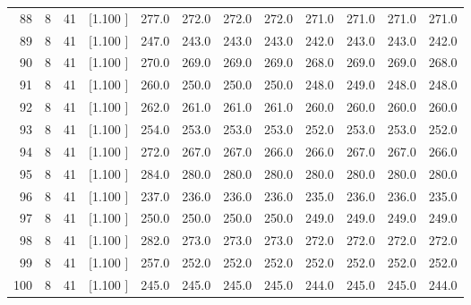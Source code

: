\documentclass[12pt,a4paper]{article}
\begin{document}
\begin{center}
{\begin{tabular}{r r r r r r r r r r r r}
  88&  8& 41&[1.100     ]&   277.0&   272.0&   272.0&   272.0&   271.0&   271.0&   271.0&   271.0\\[-0.02in]
  89&  8& 41&[1.100     ]&   247.0&   243.0&   243.0&   243.0&   242.0&   243.0&   243.0&   242.0\\[-0.02in]
  90&  8& 41&[1.100     ]&   270.0&   269.0&   269.0&   269.0&   268.0&   269.0&   269.0&   268.0\\[-0.02in]
  91&  8& 41&[1.100     ]&   260.0&   250.0&   250.0&   250.0&   248.0&   249.0&   248.0&   248.0\\[-0.02in]
  92&  8& 41&[1.100     ]&   262.0&   261.0&   261.0&   261.0&   260.0&   260.0&   260.0&   260.0\\[-0.02in]
  93&  8& 41&[1.100     ]&   254.0&   253.0&   253.0&   253.0&   252.0&   253.0&   253.0&   252.0\\[-0.02in]
  94&  8& 41&[1.100     ]&   272.0&   267.0&   267.0&   266.0&   266.0&   267.0&   267.0&   266.0\\[-0.02in]
  95&  8& 41&[1.100     ]&   284.0&   280.0&   280.0&   280.0&   280.0&   280.0&   280.0&   280.0\\[-0.02in]
  96&  8& 41&[1.100     ]&   237.0&   236.0&   236.0&   236.0&   235.0&   236.0&   236.0&   235.0\\[-0.02in]
  97&  8& 41&[1.100     ]&   250.0&   250.0&   250.0&   250.0&   249.0&   249.0&   249.0&   249.0\\[-0.02in]
  98&  8& 41&[1.100     ]&   282.0&   273.0&   273.0&   273.0&   272.0&   272.0&   272.0&   272.0\\[-0.02in]
  99&  8& 41&[1.100     ]&   257.0&   252.0&   252.0&   252.0&   252.0&   252.0&   252.0&   252.0\\[-0.02in]
 100&  8& 41&[1.100     ]&   245.0&   245.0&   245.0&   245.0&   244.0&   245.0&   245.0&   244.0\\[-0.02in]

\hline
\end{tabular}}
\end{center}
\end{document}
